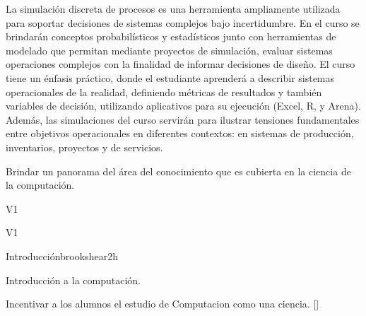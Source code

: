 \begin{syllabus}


\begin{justification}
La simulación discreta de procesos es una herramienta ampliamente utilizada
para soportar decisiones de sistemas complejos bajo incertidumbre. En el curso se brindarán conceptos probabilísticos
 y estadísticos junto con herramientas de modelado que permitan mediante proyectos de simulación, evaluar sistemas operaciones complejos con la finalidad de informar decisiones de diseño.
El curso tiene un énfasis práctico, donde el estudiante aprenderá a describir sistemas
operacionales de la realidad, definiendo métricas de resultados y también variables de decisión, utilizando aplicativos para su ejecución (Excel, R, y Arena). Además, las simulaciones del curso servirán para ilustrar tensiones fundamentales entre objetivos operacionales
en diferentes contextos: en sistemas de producción, inventarios, proyectos y de servicios.
\end{justification}

\begin{goals}
\item Brindar un panorama del área del conocimiento que es cubierta en la ciencia de la computación.
\end{goals}

\begin{outcomes}{V1}
    \item {}
\end{outcomes}

\begin{competences}{V1}
    \item {} 
    \item {} 
    \item {}
    \item {}
\end{competences}

\begin{unit}{Introducción}{}{brookshear}{2}{h}
    \begin{topics}
	\item Introducción a la computación.
   \end{topics}
   \begin{learningoutcomes}
      \item Incentivar a los alumnos el estudio de Computacion como una ciencia. [\Familiarity]
   \end{learningoutcomes}
\end{unit}


\end{syllabus}
